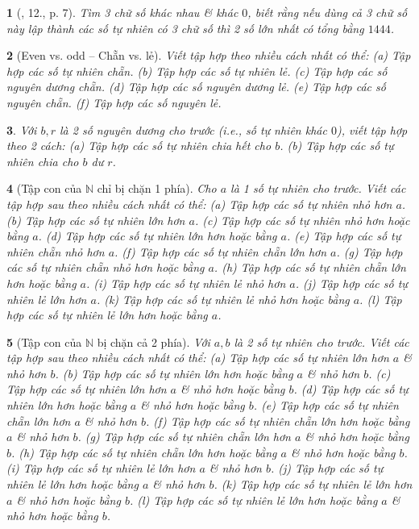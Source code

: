\documentclass{article}
\newtheorem{baitoan}{}
\begin{document}
\begin{baitoan}[\cite{Binh_Toan_6_tap_1}, 12., p. 7]
	Tìm 3 chữ số khác nhau \& khác $0$, biết rằng nếu dùng cả 3 chữ số này lập thành các số tự nhiên có 3 chữ số thì 2 số lớn nhất có tổng bằng $1444$.
\end{baitoan}

\begin{baitoan}[Even vs. odd -- Chẵn vs. lẻ]
	Viết tập hợp theo nhiều cách nhất có thể: (a) Tập hợp các số tự nhiên chẵn. (b) Tập hợp các số tự nhiên lẻ. (c) Tập hợp các số nguyên dương chẵn. (d) Tập hợp các số nguyên dương lẻ. (e) Tập hợp các số nguyên chẵn. (f) Tập hợp các số nguyên lẻ.
\end{baitoan}

\begin{baitoan}
	Với $b,r$ là 2 số nguyên dương cho trước (i.e., số tự nhiên khác $0$), viết tập hợp theo 2 cách: (a) Tập hợp các số tự nhiên chia hết cho $b$. (b) Tập hợp các số tự nhiên chia cho $b$ dư $r$.
\end{baitoan}

\begin{baitoan}[Tập con của $\mathbb{N}$ chỉ bị chặn 1 phía]
	Cho $a$ là 1 số tự nhiên cho trước. Viết các tập hợp sau theo nhiều cách nhất có thể: (a) Tập hợp các số tự nhiên nhỏ hơn $a$. (b) Tập hợp các số tự nhiên lớn hơn $a$. (c) Tập hợp các số tự nhiên nhỏ hơn hoặc bằng $a$. (d) Tập hợp các số tự nhiên lớn hơn hoặc bằng $a$. (e) Tập hợp các số tự nhiên chẵn nhỏ hơn $a$. (f) Tập hợp các số tự nhiên chẵn lớn hơn $a$. (g) Tập hợp các số tự nhiên chẵn nhỏ hơn hoặc bằng $a$. (h) Tập hợp các số tự nhiên chẵn lớn hơn hoặc bằng $a$. (i) Tập hợp các số tự nhiên lẻ nhỏ hơn $a$. (j) Tập hợp các số tự nhiên lẻ lớn hơn $a$. (k) Tập hợp các số tự nhiên lẻ nhỏ hơn hoặc bằng $a$. (l) Tập hợp các số tự nhiên lẻ lớn hơn hoặc bằng $a$.
\end{baitoan}

\begin{baitoan}[Tập con của $\mathbb{N}$ bị chặn cả 2 phía]
	Với $a,b$ là 2 số tự nhiên cho trước. Viết các tập hợp sau theo nhiều cách nhất có thể: (a) Tập hợp các số tự nhiên lớn hơn $a$ \& nhỏ hơn $b$. (b) Tập hợp các số tự nhiên lớn hơn hoặc bằng $a$ \& nhỏ hơn $b$. (c) Tập hợp các số tự nhiên lớn hơn $a$ \& nhỏ hơn hoặc bằng $b$. (d) Tập hợp các số tự nhiên lớn hơn hoặc bằng $a$ \& nhỏ hơn hoặc bằng $b$. (e) Tập hợp các số tự nhiên chẵn lớn hơn $a$ \& nhỏ hơn $b$. (f) Tập hợp các số tự nhiên chẵn lớn hơn hoặc bằng $a$ \& nhỏ hơn $b$. (g) Tập hợp các số tự nhiên chẵn lớn hơn $a$ \& nhỏ hơn hoặc bằng $b$. (h) Tập hợp các số tự nhiên chẵn lớn hơn hoặc bằng $a$ \& nhỏ hơn hoặc bằng $b$. (i) Tập hợp các số tự nhiên lẻ lớn hơn $a$ \& nhỏ hơn $b$. (j) Tập hợp các số tự nhiên lẻ lớn hơn hoặc bằng $a$ \& nhỏ hơn $b$. (k) Tập hợp các số tự nhiên lẻ lớn hơn $a$ \& nhỏ hơn hoặc bằng $b$. (l) Tập hợp các số tự nhiên lẻ lớn hơn hoặc bằng $a$ \& nhỏ hơn hoặc bằng $b$.
\end{baitoan}
\end{document}
